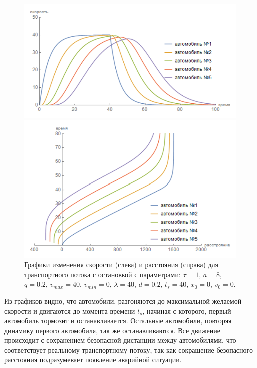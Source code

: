 \documentclass[12pt, a4paper]{extarticle}
\numberwithin{equation}{section}
\begin{document}
\begin{figure}[h!]
	\begin{center}
		\begin{minipage}[h!]{0.48\linewidth}
			\includegraphics[width=1\linewidth,height=0.2\textheight]
			{Images/simple_model_speed.png}
		\end{minipage}
		\hfill 
		\begin{minipage}[h!]{0.48\linewidth}
			\includegraphics[width=1\linewidth,height=0.2\textheight]
			{Images/simple_model_distance.png}
		\end{minipage}
		\caption{Графики изменения скорости (слева) и расстояния (справа) для транспортного потока с остановкой с параметрами: $\tau=1$, $a=8$, $q=0.2$, $v_{max}=40$, $v_{min}=0$, $\lambda=40$, $d=0.2$, $t_s=40$, $x_0=0$, $v_0=0$.}
		\label{follow_the_leader}
	\end{center}
\end{figure}

Из графиков видно, что автомобили, разгоняются до максимальной желаемой скорости и двигаются до момента времени $t_s$, начиная с которого, первый автомобиль тормозит и останавливается. Остальные автомобили, повторяя динамику первого автомобиля, так же останавливаются. Все движение происходит с сохранением безопасной дистанции между автомобилями, что соответствует реальному транспортному потоку, так как сокращение безопасного расстояния подразумевает появление аварийной ситуации.
\end{document}
